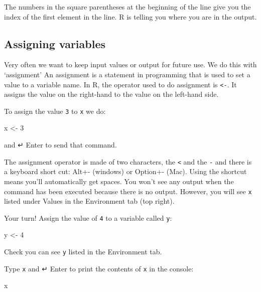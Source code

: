 \documentclass[
  letterpaper,
  DIV=11,
  numbers=noendperiod]{scrreprt}
\newenvironment{Shaded}{\begin{snugshade}}{\end{snugshade}}
\newcommand{\DecValTok}[1]{\textcolor[rgb]{0.68,0.00,0.00}{#1}}
\newcommand{\NormalTok}[1]{\textcolor[rgb]{0.00,0.23,0.31}{#1}}
\newcommand{\OtherTok}[1]{\textcolor[rgb]{0.00,0.23,0.31}{#1}}
\begin{document}
The numbers in the square parentheses at the beginning of the line give
you the index of the first element in the line. R is telling you where
you are in the output.

\hypertarget{assigning-variables}{%
\subsection{Assigning variables}\label{assigning-variables}}

Very often we want to keep input values or output for future use. We do
this with `assignment' An assignment is a statement in programming that
is used to set a value to a variable name. In R, the operator used to do
assignment is \texttt{\textless{}-}. It assigns the value on the
right-hand to the value on the left-hand side.

To assign the value \texttt{3} to \texttt{x} we do:

\begin{Shaded}
\begin{Highlighting}[]
\NormalTok{x }\OtherTok{\textless{}{-}} \DecValTok{3}
\end{Highlighting}
\end{Shaded}

and ↵ Enter to send that command.

The assignment operator is made of two characters, the
\texttt{\textless{}} and the \texttt{-} and there is a keyboard short
cut: Alt+- (windows) or Option+- (Mac). Using the shortcut means you'll
automatically get spaces. You won't see any output when the command has
been executed because there is no output. However, you will see
\texttt{x} listed under Values in the Environment tab (top right).

Your turn! Assign the value of \texttt{4} to a variable called
\texttt{y}:

\begin{Shaded}
\begin{Highlighting}[]
\NormalTok{y }\OtherTok{\textless{}{-}} \DecValTok{4}
\end{Highlighting}
\end{Shaded}

Check you can see \texttt{y} listed in the Environment tab.

Type \texttt{x} and ↵ Enter to print the contents of \texttt{x} in the
console:

\begin{Shaded}
\begin{Highlighting}[]
\NormalTok{x}
\end{Highlighting}
\end{Shaded}
\end{document}
